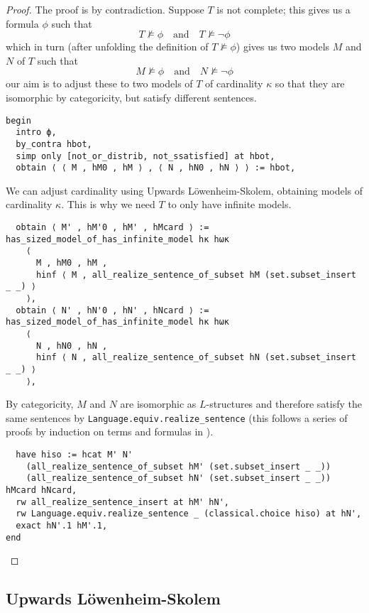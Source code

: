 \begin{proof}
The proof is by contradiction.
Suppose $T$ is not complete;
this gives us a formula $\phi$ such that
\[ T \nvDash \phi \quad \text{and} \quad T \nvDash \neg \phi \]
which in turn (after unfolding the definition of $T \nvDash \phi$)
gives us two models $M$ and $N$ of $T$ such that
\[ M \nvDash \phi \quad \text{and} \quad N \nvDash \neg \phi \]
our aim is to adjust these to two models of $T$
of cardinality $\kappa$ so that they are isomorphic by categoricity,
but satisfy different sentences.

\begin{lstlisting}
begin
  intro ϕ,
  by_contra hbot,
  simp only [not_or_distrib, not_ssatisfied] at hbot,
  obtain ⟨ ⟨ M , hM0 , hM ⟩ , ⟨ N , hN0 , hN ⟩ ⟩ := hbot,
\end{lstlisting}

We can adjust cardinality using Upwards L\"{o}wenheim-Skolem,
obtaining models of cardinality $\kappa$.
This is why we need $T$ to only have infinite models.
\begin{lstlisting}
  obtain ⟨ M' , hM'0 , hM' , hMcard ⟩ := has_sized_model_of_has_infinite_model hκ hωκ
    ⟨
      M , hM0 , hM ,
      hinf ⟨ M , all_realize_sentence_of_subset hM (set.subset_insert _ _) ⟩
    ⟩,
  obtain ⟨ N' , hN'0 , hN' , hNcard ⟩ := has_sized_model_of_has_infinite_model hκ hωκ
    ⟨
      N , hN0 , hN ,
      hinf ⟨ N , all_realize_sentence_of_subset hN (set.subset_insert _ _) ⟩
    ⟩, \end{lstlisting}

By categoricity, $M$ and $N$ are isomorphic as $L$-structures
and therefore satisfy the same sentences by
\texttt{Language.equiv.realize\_sentence}
(this follows a series of proofs by induction on terms and formulas in
).

\begin{lstlisting}
  have hiso := hcat M' N'
    (all_realize_sentence_of_subset hM' (set.subset_insert _ _))
    (all_realize_sentence_of_subset hN' (set.subset_insert _ _)) hMcard hNcard,
  rw all_realize_sentence_insert at hM' hN',
  rw Language.equiv.realize_sentence _ (classical.choice hiso) at hN',
  exact hN'.1 hM'.1,
end
\end{lstlisting}
\end{proof}

\subsection{Upwards L\"{o}wenheim-Skolem}

